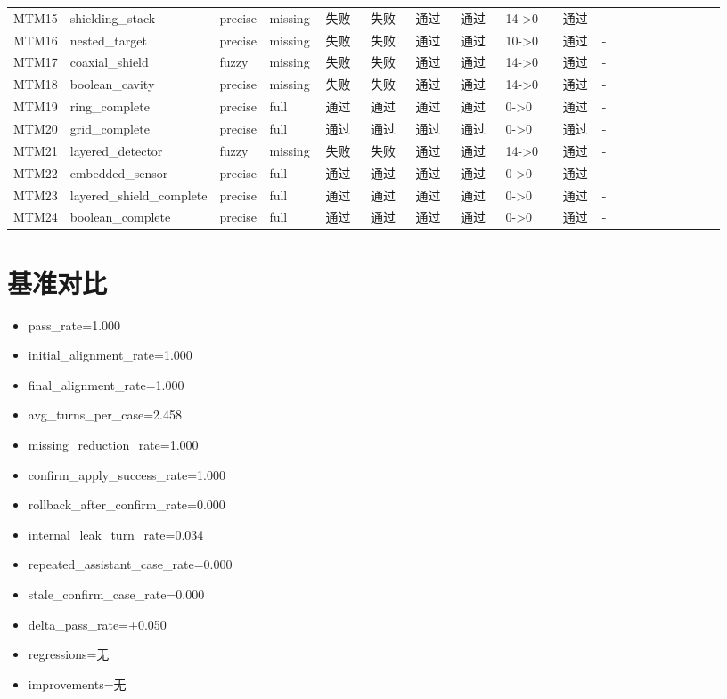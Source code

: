 \documentclass[11pt]{ctexart}
\begin{document}
\begin{longtable}{p{0.06\linewidth}p{0.08\linewidth}p{0.07\linewidth}p{0.08\linewidth}p{0.07\linewidth}p{0.07\linewidth}p{0.07\linewidth}p{0.07\linewidth}p{0.09\linewidth}p{0.06\linewidth}p{0.21\linewidth}}
MTM15 & shielding\_stack & precise & missing & 失败 & 失败 & 通过 & 通过 & 14->0 & 通过 & - \\
MTM16 & nested\_target & precise & missing & 失败 & 失败 & 通过 & 通过 & 10->0 & 通过 & - \\
MTM17 & coaxial\_shield & fuzzy & missing & 失败 & 失败 & 通过 & 通过 & 14->0 & 通过 & - \\
MTM18 & boolean\_cavity & precise & missing & 失败 & 失败 & 通过 & 通过 & 14->0 & 通过 & - \\
MTM19 & ring\_complete & precise & full & 通过 & 通过 & 通过 & 通过 & 0->0 & 通过 & - \\
MTM20 & grid\_complete & precise & full & 通过 & 通过 & 通过 & 通过 & 0->0 & 通过 & - \\
MTM21 & layered\_detector & fuzzy & missing & 失败 & 失败 & 通过 & 通过 & 14->0 & 通过 & - \\
MTM22 & embedded\_sensor & precise & full & 通过 & 通过 & 通过 & 通过 & 0->0 & 通过 & - \\
MTM23 & layered\_shield\_complete & precise & full & 通过 & 通过 & 通过 & 通过 & 0->0 & 通过 & - \\
MTM24 & boolean\_complete & precise & full & 通过 & 通过 & 通过 & 通过 & 0->0 & 通过 & - \\
\bottomrule
\end{longtable}
\section{基准对比}
\begin{itemize}
\item pass\_rate=1.000
\item initial\_alignment\_rate=1.000
\item final\_alignment\_rate=1.000
\item avg\_turns\_per\_case=2.458
\item missing\_reduction\_rate=1.000
\item confirm\_apply\_success\_rate=1.000
\item rollback\_after\_confirm\_rate=0.000
\item internal\_leak\_turn\_rate=0.034
\item repeated\_assistant\_case\_rate=0.000
\item stale\_confirm\_case\_rate=0.000
\item delta\_pass\_rate=+0.050
\item regressions=无
\item improvements=无
\end{itemize}
\appendix
\end{document}
